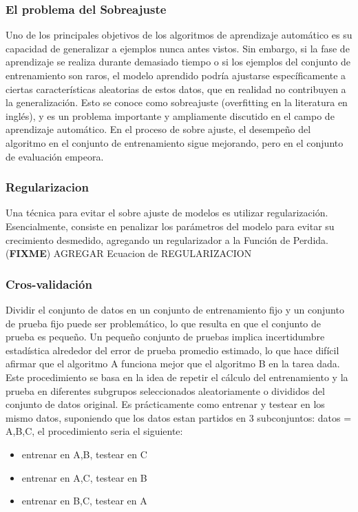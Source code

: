 \documentclass[a4paper,11pt,spanish]{book}
\newcommand*{\FIXME}[1]{{(\textbf{FIXME}) {#1}}}
\begin{document}
	\subsubsection {El problema del Sobreajuste}
	  Uno de los principales objetivos de los algoritmos de aprendizaje automático es su capacidad de generalizar a ejemplos nunca antes vistos. Sin embargo, si la fase 
	  de aprendizaje se realiza durante demasiado tiempo o si los ejemplos del conjunto de entrenamiento son raros, el modelo aprendido podría ajustarse específicamente 
	  a ciertas características aleatorias de estos datos, que en realidad no contribuyen a la generalización. Esto se conoce como sobreajuste (overfitting en la literatura en inglés), 
	  y es un problema importante y ampliamente discutido en el campo de aprendizaje automático. En el proceso de sobre ajuste, el desempeño del algoritmo en el
	  conjunto de entrenamiento sigue mejorando, pero en el conjunto de evaluación empeora.
	  
	\subsubsection {Regularizacion}
	  Una técnica para evitar el sobre ajuste de modelos es utilizar regularización. Esencialmente, consiste en penalizar los parámetros del modelo para evitar su
	  crecimiento desmedido, agregando un regularizador a la Función de Perdida.
	  \FIXME{AGREGAR Ecuacion de REGULARIZACION}
	  
	\subsubsection {Cros-validación}
	  Dividir el conjunto de datos en un conjunto de entrenamiento fijo y un conjunto de prueba fijo puede ser problemático, lo que resulta en que el conjunto de prueba es pequeño. 
	  Un pequeño conjunto de pruebas implica incertidumbre estadística alrededor del error de prueba promedio estimado, lo que hace difícil afirmar que el algoritmo A funciona mejor que el algoritmo B en la tarea dada.
	  Este procedimiento se basa en la idea de repetir el cálculo del entrenamiento y la prueba en diferentes subgrupos seleccionados aleatoriamente o divididos del conjunto de datos original.
	  Es prácticamente como entrenar y testear en los mismo datos, suponiendo que los datos estan partidos en 3 subconjuntos: datos = {A,B,C}, el procedimiento seria el siguiente:
	  \begin{itemize}
	    \item entrenar en A,B, testear en C
	    \item entrenar en A,C, testear en B
	    \item entrenar en B,C, testear en A
	  \end{itemize}
\end{document}
